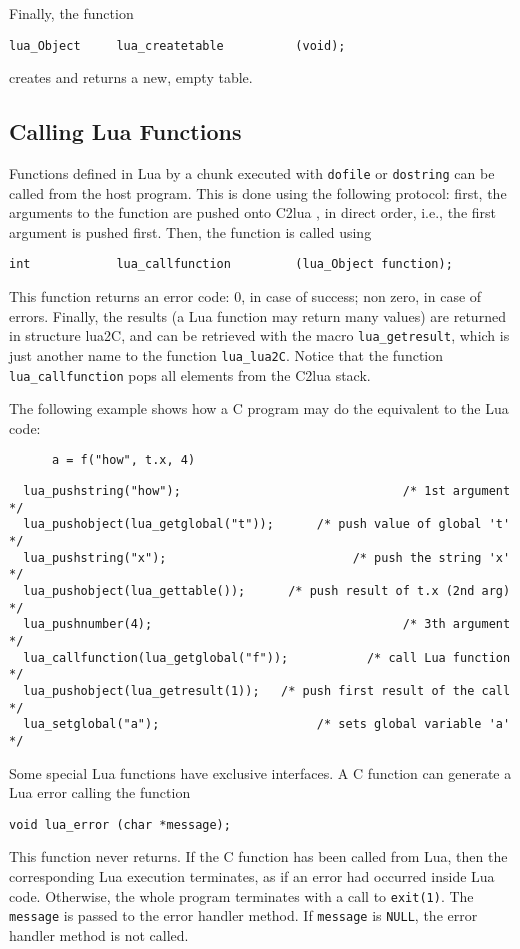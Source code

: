 Finally, the function
\begin{verbatim}
lua_Object     lua_createtable          (void);
\end{verbatim}
creates and returns a new, empty table.


\subsection{Calling Lua Functions}
Functions defined in Lua by a chunk executed with
\verb|dofile| or \verb|dostring| can be called from the host program.
This is done using the following protocol:
first, the arguments to the function are pushed onto C2lua
, in direct order, i.e., the first argument is pushed first.
Then, the function is called using
\begin{verbatim}
int            lua_callfunction         (lua_Object function);
\end{verbatim}
This function returns an error code:
0, in case of success; non zero, in case of errors.
Finally, the results (a Lua function may return many values)
are returned in structure lua2C,
and can be retrieved with the macro \verb|lua_getresult|,
which is just another name to the function \verb|lua_lua2C|.
Notice that the function \verb|lua_callfunction|
pops all elements from the C2lua stack.

The following example shows how a C program may do the
equivalent to the Lua code:
\begin{verbatim}
      a = f("how", t.x, 4)
\end{verbatim}
\begin{verbatim}
  lua_pushstring("how");                               /* 1st argument */
  lua_pushobject(lua_getglobal("t"));      /* push value of global 't' */
  lua_pushstring("x");                          /* push the string 'x' */
  lua_pushobject(lua_gettable());      /* push result of t.x (2nd arg) */
  lua_pushnumber(4);                                   /* 3th argument */
  lua_callfunction(lua_getglobal("f"));           /* call Lua function */
  lua_pushobject(lua_getresult(1));   /* push first result of the call */
  lua_setglobal("a");                      /* sets global variable 'a' */
\end{verbatim}

Some special Lua functions have exclusive interfaces.
A C function can generate a Lua error calling the function
\begin{verbatim}
void lua_error (char *message);
\end{verbatim}
This function never returns.
If the C function has been called from Lua,
then the corresponding Lua execution terminates,
as if an error had occurred inside Lua code.
Otherwise, the whole program terminates with a call to \verb|exit(1)|.
The \verb|message| is passed to the error handler method.
If \verb|message| is \verb|NULL|,
the error handler method is not called.

